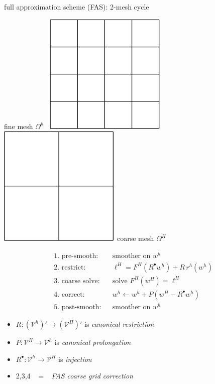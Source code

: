 \documentclass[svgnames,
               hyperref={colorlinks,citecolor=DeepPink4,linkcolor=FireBrick,urlcolor=Maroon},
               usepdftitle=false]  %
               {beamer}
\newcommand{\iR}{R^{\bullet}}
\begin{document}
\begin{frame}{full approximation scheme (FAS): 2-mesh cycle}

\begin{center}
fine mesh $\Omega^h$ \, \includegraphics[height=0.14\textheight]{../talk-oxford/images/fine-grid.png} \hspace{15mm} \includegraphics[height=0.14\textheight]{../talk-oxford/images/coarse-grid.png} \,coarse mesh $\Omega^H$
\end{center}

\begin{align*}
&\text{1. pre-smooth:}   & & \text{smoother on } w^h \\
&\text{2. restrict:}     & &\ell^H = F^H(\iR w^h) + R\, r^h(w^h) \\
&\text{3. coarse solve:} & & \text{solve } F^H(w^H) = \ell^H \\
&\text{4. correct:}      & &w^h \leftarrow w^h + P(w^H - \iR w^h) \\
&\text{5. post-smooth:}  & & \text{smoother on } w^h
\end{align*}

\bigskip
{\small
\begin{itemize}
\item $R: (\mathcal{V}^h)' \to (\mathcal{V}^H)'$ is \emph{canonical restriction}
\item $P: \mathcal{V}^H \to \mathcal{V}^h$ is \emph{canonical prolongation}
\item $\iR: \mathcal{V}^h \to \mathcal{V}^H$ is \emph{injection}
\item 2,3,4 \, $=$ \, \emph{FAS coarse grid correction}
\end{itemize}
}
\end{frame}
\end{document}
